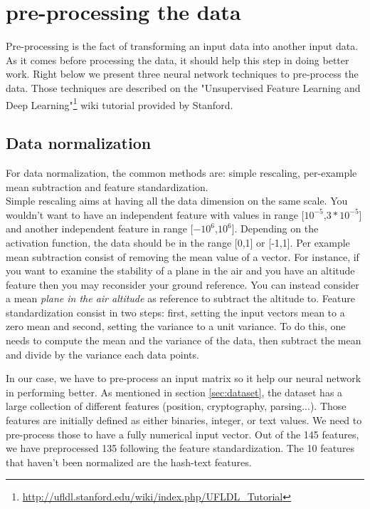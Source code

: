 

\section{pre-processing the data}
\label{sec:preprocessing}

	Pre-processing is the fact of transforming an input data into another input data. As it comes before processing the data, it should help this step in doing better work.
	Right below we present three neural network techniques to pre-process the data. Those techniques are described on the "Unsupervised Feature Learning and Deep Learning"\footnote{\url{http://ufldl.stanford.edu/wiki/index.php/UFLDL_Tutorial}} wiki tutorial provided by Stanford.

	\subsection{Data normalization}
		For data normalization, the common methods are: simple rescaling, per-example mean subtraction and feature standardization.\\
		Simple rescaling aims at having all the data dimension on the same scale. You wouldn't want to have an independent feature with values in range [$10^{-5}$,$3*10^{-5}$] and another independent feature in range [$-10^{6}$,$10^{6}$]. Depending on the activation function, the data should be in the range [0,1] or [-1,1].
		Per example mean subtraction consist of removing the mean value of a vector. For instance, if you want to examine the stability of a plane in the air and you have an altitude feature then you may reconsider your ground reference. You can instead consider a mean \textit{plane in the air altitude} as reference to subtract the altitude to.
		Feature standardization consist in two steps: first, setting the input vectors mean to a zero mean and second, setting the variance to a unit variance. To do this, one needs to compute the mean and the variance of the data, then subtract the mean and divide by the variance each data points.



	In our case, we have to pre-process an input matrix so it help our neural network in performing better.
	As mentioned in section \ref{sec:dataset}, the dataset has a large collection of different features (position, cryptography, parsing...). Those features are initially defined as either binaries, integer, or text values. We need to pre-process those to have a fully numerical input vector.
	Out of the 145 features, we have preprocessed 135 following the feature standardization. The 10 features that haven't been normalized are the hash-text features.



